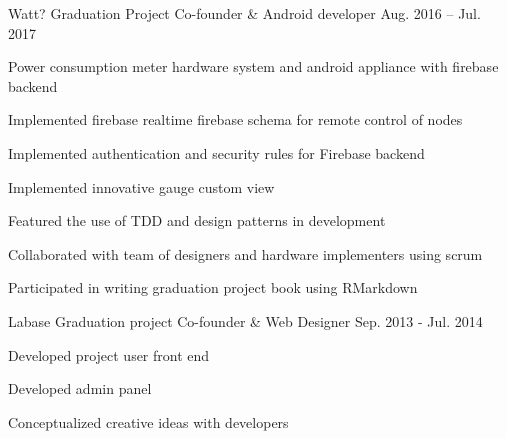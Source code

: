\begin{cvprojects}
\cvproject
    {Watt? Graduation Project} %
    {Co-founder \& Android developer} %
    {Aug. 2016 – Jul. 2017} %
    {
      \begin{cvitems} %
        \item {Power consumption meter hardware system and android appliance with firebase backend}
        \item {Implemented firebase realtime firebase schema for remote control of nodes}
        \item {Implemented authentication and security rules for Firebase backend}
        \item {Implemented innovative gauge custom view}
        \item {Featured the use of TDD and design patterns in development}
        \item {Collaborated with team of designers and hardware implementers using scrum}
        \item {Participated in writing graduation project book using RMarkdown}        
      \end{cvitems}
    }

\cvproject
{Labase Graduation project} %
{Co-founder \& Web Designer} %
{Sep. 2013 - Jul. 2014} %
{
  \begin{cvitems} %
    \item {Developed project user front end}
    \item {Developed admin panel}
    \item {Conceptualized creative ideas with developers}
  \end{cvitems}
}

\end{cvprojects}
